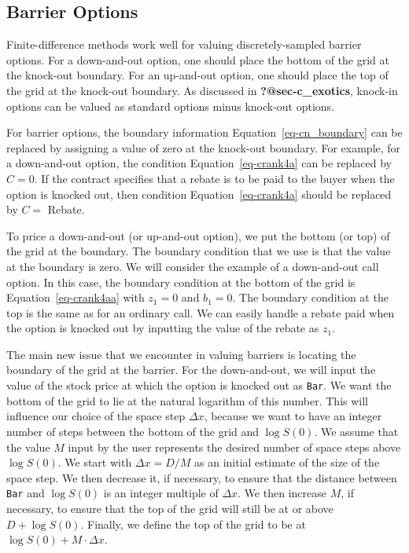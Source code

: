\documentclass[
  letterpaper,
  DIV=11,
  numbers=noendperiod]{scrartcl}
\theoremstyle{definition}
\theoremstyle{remark}
\begin{document}
\subsection{Barrier Options}\label{sec-s_finitedifferencebarriers}

Finite-difference
methods work well for valuing discretely-sampled barrier options. For a
down-and-out option, one should place the bottom of the grid at the
knock-out boundary. For an up-and-out option, one should place the top
of the grid at the knock-out boundary. As discussed in
\textbf{?@sec-c\_exotics}, knock-in options can be valued as standard
options minus knock-out options.

For barrier options, the boundary information
Equation~\ref{eq-cn_boundary} can be replaced by assigning a value of
zero at the knock-out boundary. For example, for a down-and-out option,
the condition Equation~\ref{eq-crank4a} can be replaced by \(C=0\). If
the contract specifies that a rebate is to be paid to the buyer when the
option is knocked out, then condition Equation~\ref{eq-crank4a} should
be replaced by \(C=\) Rebate.

To price a down-and-out (or up-and-out option), we put the bottom (or
top) of the grid at the boundary. The boundary condition that we use is
that the value at the boundary is zero. We will consider the example of
a down-and-out call option. In this case, the boundary condition at the
bottom of the grid is Equation~\ref{eq-crank4aa} with \(z_1=0\) and
\(b_1 = 0\). The boundary condition at the top is the same as for an
ordinary call. We can easily handle a rebate paid when the option is
knocked out by inputting the value of the rebate as \(z_1\).

The main new issue that we encounter in valuing barriers is locating the
boundary of the grid at the barrier. For the down-and-out, we will input
the value of the stock price at which the option is knocked out as
\texttt{Bar}. We want the bottom of the grid to lie at the natural
logarithm of this number. This will influence our choice of the space
step \(\Delta x\), because we want to have an integer number of steps
between the bottom of the grid and \(\log S(0)\). We assume that the
value \(M\) input by the user represents the desired number of space
steps above \(\log S(0)\). We start with \(\Delta x=D/M\) as an initial
estimate of the size of the space step. We then decrease it, if
necessary, to ensure that the distance between \texttt{Bar} and
\(\log S(0)\) is an integer multiple of \(\Delta x\). We then increase
\(M\), if necessary, to ensure that the top of the grid will still be at
or above \(D+\log S(0)\). Finally, we define the top of the grid to be
at \(\log S(0) +M \cdot \Delta x\).
\end{document}
